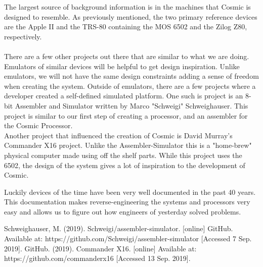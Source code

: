 \documentclass[conference]{IEEEtran}
\begin{document}
The largest source of background information is in the machines that Cosmic is designed to resemble. As previously mentioned, the two primary reference devices are the Apple II and the TRS-80 containing the MOS 6502 and the Zilog Z80, respectively. \\\\ There are a few other projects out there that are similar to what we are doing. Emulators of similar devices will be helpful to get design inspiration. Unlike emulators, we will not have the same design constraints adding a sense of freedom when creating the system.  Outside of emulators, there are a few projects where a developer created a self-defined simulated platform. One such is project is an 8-bit Assembler and Simulator written by Marco "Schweigi" Schweighauser\cite{b1}. This project is similar to our first step of creating a processor, and an assembler for the Cosmic Processor.\\ Another project that influenced the creation of Cosmic is David Murray's Commander X16 project\cite{b2}. Unlike the Assembler-Simulator this is a "home-brew" physical computer made using off the shelf parts. While this project uses the 6502, the design of the system gives a lot of inspiration to the development of Cosmic.

    Luckily devices of the time have been very well documented in the past 40 years. This documentation makes
reverse-engineering the systems and processors very easy and allows us to figure out how
engineers of yesterday solved problems. 


\begin{thebibliography}{00}
 Schweighauser, M. (2019). Schweigi/assembler-simulator. [online] GitHub. Available at: https://github.com/Schweigi/assembler-simulator [Accessed 7 Sep. 2019].
GitHub. (2019). Commander X16. [online] Available at: https://github.com/commanderx16 [Accessed 13 Sep. 2019].

\end{thebibliography}
\end{document}
